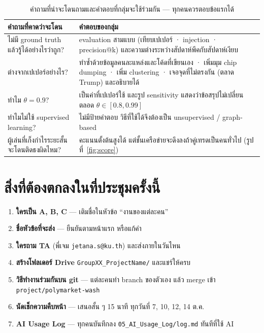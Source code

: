 \documentclass[11pt,a4paper]{article}
\newcommand{\sansall}{\sffamily}
\newcommand{\en}[1]{#1}
\newcommand{\code}[1]{\texttt{#1}}
\newcommand{\stg}[2]{\textcolor{#1}{\textbf{\en{#2}}}}
\newcommand{\rA}{\stg{accent}{A}}
\newcommand{\rB}{\stg{alg}{B}}
\newcommand{\rC}{\stg{ext}{C}}
\newcommand{\thd}[1]{\sansall\bfseries #1}
\begin{document}
\begin{table}[H]
\centering\small
\begin{tabular}{L{4.6cm}L{9.6cm}}
\toprule
\thd{คำถามที่คาดว่าจะโดน} & \thd{คำตอบของกลุ่ม} \\
\midrule
ไม่มี ground truth แล้วรู้ได้อย่างไรว่าถูก? &
  evaluation สามแบบ (เทียบเปเปอร์ · injection · precision@k) และความต่างระหว่างสัปดาห์พีคกับสัปดาห์เงียบ \\
\addlinespace
ต่างจากเปเปอร์อย่างไร? &
  ทำซ้ำด้วยข้อมูลคนละแหล่งและโค้ดที่เขียนเอง · เพิ่มมุม chip dumping · เพิ่ม clustering ·
  เจอจุดที่ไม่ตรงกัน (ตลาด Trump) และอธิบายได้ \\
\addlinespace
ทำไม $\theta = 0.9$? &
  เป็นค่าที่เปเปอร์ใช้ และรูป sensitivity แสดงว่าข้อสรุปไม่เปลี่ยนตลอด $\theta \in [0.8, 0.99]$ \\
\addlinespace
ทำไมไม่ใช้ supervised learning? &
  ไม่มีป้ายคำตอบ วิธีที่ใช้ได้จึงต้องเป็น unsupervised / graph-based \\
\addlinespace
ผู้เล่นที่เก็งกำไรระยะสั้นจะโดนติดธงผิดไหม? &
  คะแนนตั้งต้นสูงได้ แต่ชั้นเครือข่ายจะดึงลงถ้าคู่เทรดเป็นคนทั่วไป (รูปที่~\ref{fig:score}) \\
\bottomrule
\end{tabular}
\caption{คำถามที่น่าจะโดนถามและคำตอบที่กลุ่มจะใช้ร่วมกัน --- ทุกคนควรตอบข้อแรกได้}
\end{table}

\section{สิ่งที่ต้องตกลงในที่ประชุมครั้งนี้}

\begin{enumerate}
\item \textbf{ใครเป็น \rA{}, \rB{}, \rC{}} --- เติมชื่อในหัวข้อ ``งานของแต่ละคน''
\item \textbf{ชื่อหัวข้อที่จะส่ง} --- ยืนยันตามหน้าแรก หรือแก้คำ
\item \textbf{ใครถาม TA} (พี่เจม \code{jetana.s@ku.th}) และส่งภายในวันไหน
\item \textbf{สร้างโฟลเดอร์ Drive} \code{GroupXX\_ProjectName/} และแชร์ให้ครบ
\item \textbf{วิธีทำงานร่วมกันบน git} --- แต่ละคนทำ branch ของตัวเอง แล้ว merge เข้า \code{project/polymarket-wash}
\item \textbf{นัดเช็กความคืบหน้า} --- เสนอสั้น ๆ 15 นาที ทุกวันที่ 7, 10, 12, 14 ต.ค.
\item \textbf{AI Usage Log} --- ทุกคนบันทึกลง \code{05\_AI\_Usage\_Log/log.md} ทันทีที่ใช้ AI
\end{enumerate}
\end{document}
